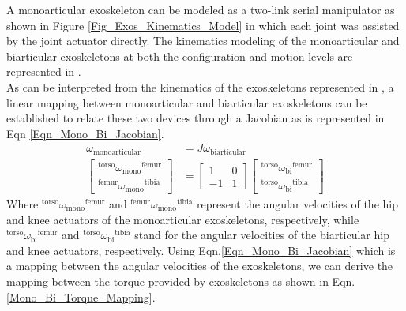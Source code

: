 \documentclass[10pt,letterpaper]{article}
\begin{document}
A monoarticular exoskeleton can be modeled as a two-link serial manipulator as shown in Figure \ref{Fig_Exos_Kinematics_Model} in which each joint was assisted by the joint actuator directly. The kinematics modeling of the monoarticular and biarticular exoskeletons at both the configuration and motion levels are represented in .\\
As can be interpreted from the kinematics of the exoskeletons represented in , a linear mapping between monoarticular and biarticular exoskeletons can be established to relate these two devices through a Jacobian as is represented in Eqn \eqref{Eqn_Mono_Bi_Jacobian}.
\begin{equation}\label{Eqn_Mono_Bi_Jacobian}
\begin{aligned}
\omega_{\mathrm{monoarticular}} &= J\omega_{\mathrm{biarticular}}\\
\left\lbrack \begin{array}{c}
{}^{\mathrm{torso}} {\omega_{\mathrm{mono}} }^{\mathrm{femur}} \\
{}^{\mathrm{femur}} {\omega_{\mathrm{mono}} }^{\mathrm{tibia}} 
\end{array}\right\rbrack &=\left\lbrack \begin{array}{cc}
1 & 0\\
-1 & 1
\end{array}\right\rbrack \left\lbrack \begin{array}{c}
{}^{\mathrm{torso}} {\omega_{\mathrm{bi}} }^{\mathrm{femur}} \\
{}^{\mathrm{torso}} {\omega_{\mathrm{bi}} }^{\mathrm{tibia}} 
\end{array}\right\rbrack
\end{aligned}
\end{equation}
Where ${}^{\mathrm{torso}} {\omega_{\mathrm{mono}} }^{\mathrm{femur}}$ and ${}^{\mathrm{femur}} {\omega_{\mathrm{mono}} }^{\mathrm{tibia}}$ represent the angular velocities of the hip and knee actuators of the monoarticular exoskeletons, respectively, while ${}^{\mathrm{torso}} {\omega_{\mathrm{bi}} }^{\mathrm{femur}}$ and ${}^{\mathrm{torso}} {\omega_{\mathrm{bi}} }^{\mathrm{tibia}}$ stand for the angular velocities of the biarticular hip and knee actuators, respectively.    Using Eqn.\eqref{Eqn_Mono_Bi_Jacobian} which is a mapping between the angular velocities of the exoskeletons, we can derive the mapping between the torque provided by exoskeletons as shown in Eqn. \eqref{Mono_Bi_Torque_Mapping}.
\end{document}
